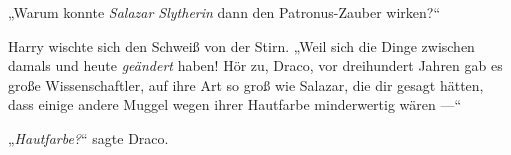 „Warum konnte \emph{Salazar Slytherin} dann den Patronus-Zauber wirken?“

Harry wischte sich den Schweiß von der Stirn.
„Weil sich die Dinge zwischen damals und heute \emph{geändert} haben! Hör zu, Draco, vor dreihundert Jahren gab es große Wissenschaftler, auf ihre Art so groß wie Salazar, die dir gesagt hätten, dass einige andere Muggel wegen ihrer Hautfarbe minderwertig wären —“

„\emph{Hautfarbe?}“ sagte Draco.

